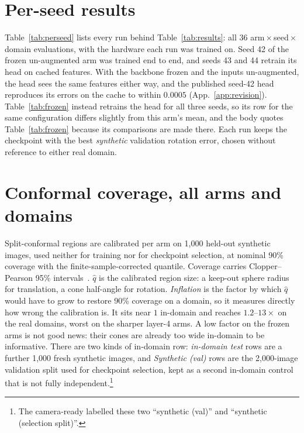 
\section{Per-seed results}
\label{app:perseed}

Table~\ref{tab:perseed} lists every run behind Table~\ref{tab:results}: all 36
arm\,$\times$\,seed\,$\times$\,domain evaluations, with the hardware each run was trained on.
Seed 42 of the frozen un-augmented arm was trained end to end, and seeds 43 and 44 retrain its
head on cached features. With the backbone frozen and the inputs un-augmented, the head sees
the same features either way, and the published seed-42 head reproduces its errors on the
cache to within $0.0005$ (App.~\ref{app:revision}). Table~\ref{tab:frozen} instead retrains the
head for all three seeds, so its row for the same configuration differs slightly from this
arm's mean, and the body quotes Table~\ref{tab:frozen} because its comparisons are made there.
Each run
keeps the checkpoint with the best \emph{synthetic} validation rotation error, chosen without
reference to either real domain.



\section{Conformal coverage, all arms and domains}
\label{app:conformal}

Split-conformal regions are calibrated per arm on 1{,}000 held-out synthetic images, used
neither for training nor for checkpoint selection, at nominal 90\% coverage with the
finite-sample-corrected quantile. Coverage carries Clopper--Pearson 95\%
intervals~\citep{clopper1934use}. $\hat{q}$ is the calibrated region size: a keep-out sphere
radius for translation, a cone half-angle for rotation. \emph{Inflation} is the factor by which
$\hat{q}$ would have to grow to restore 90\% coverage on a domain, so it measures directly how
wrong the calibration is. It sits near $1$ in-domain and reaches $1.2$--$13\times$ on the real
domains, worst on the sharper layer-4 arms. A low factor on the frozen arms is not good news:
their cones are already too wide in-domain to be informative. There are two kinds of
in-domain row: \emph{in-domain test} rows are a further 1{,}000 fresh synthetic images, and
\emph{Synthetic (val)} rows are the 2{,}000-image validation split used for checkpoint
selection, kept as a second in-domain control that is not fully independent.\footnote{The camera-ready labelled
these two ``synthetic (val)'' and ``synthetic (selection split)''.}


